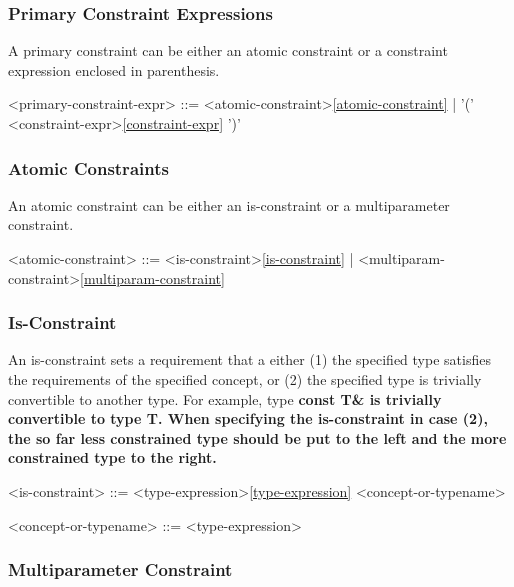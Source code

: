 \documentclass[a4paper,oneside,11pt]{article}
\begin{document}
\subsubsection{Primary Constraint Expressions}

A primary constraint can be either an atomic constraint or a constraint expression enclosed in parenthesis.

\begin{grammar}
\label{primary-constraint-expr}<primary-constraint-expr> ::= <atomic-constraint>\ref{atomic-constraint} | '(' <constraint-expr>\ref{constraint-expr} ')'
\end{grammar}

\subsubsection{Atomic Constraints}

An atomic constraint can be either an is-constraint or a multiparameter constraint.

\begin{grammar}
\label{atomic-constraint}<atomic-constraint> ::= <is-constraint>\ref{is-constraint} | <multiparam-constraint>\ref{multiparam-constraint}
\end{grammar}

\subsubsection{Is-Constraint}

An is-constraint sets a requirement that a either (1) the specified type satisfies the requirements of the specified concept, or (2) the specified type is trivially convertible to another type. For example, type \bf{const T\&} is trivially convertible to type \bf{T}.
When specifying the is-constraint in case (2), the so far less constrained type should be put to the left and the more constrained type to the right.

\begin{grammar}
\label{is-constraint}<is-constraint> ::= <type-expression>\ref{type-expression}  <concept-or-typename>

<concept-or-typename> ::= <type-expression>
\end{grammar}

\subsubsection{Multiparameter Constraint}
\end{document}
